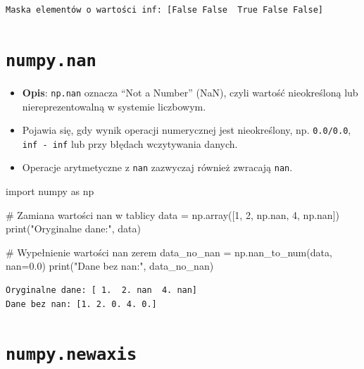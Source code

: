 \documentclass[
  polish,
  letterpaper,
  DIV=11,
  numbers=noendperiod]{scrreprt}
\newenvironment{Shaded}{\begin{snugshade}}{\end{snugshade}}
\newcommand{\BuiltInTok}[1]{\textcolor[rgb]{0.00,0.23,0.31}{#1}}
\newcommand{\CommentTok}[1]{\textcolor[rgb]{0.37,0.37,0.37}{#1}}
\newcommand{\DecValTok}[1]{\textcolor[rgb]{0.68,0.00,0.00}{#1}}
\newcommand{\FloatTok}[1]{\textcolor[rgb]{0.68,0.00,0.00}{#1}}
\newcommand{\ImportTok}[1]{\textcolor[rgb]{0.00,0.46,0.62}{#1}}
\newcommand{\NormalTok}[1]{\textcolor[rgb]{0.00,0.23,0.31}{#1}}
\newcommand{\OperatorTok}[1]{\textcolor[rgb]{0.37,0.37,0.37}{#1}}
\newcommand{\StringTok}[1]{\textcolor[rgb]{0.13,0.47,0.30}{#1}}
\providecommand{\tightlist}{%
  \setlength{\itemsep}{0pt}\setlength{\parskip}{0pt}}
\begin{document}
\begin{verbatim}
Maska elementów o wartości inf: [False False  True False False]
\end{verbatim}

\section{\texorpdfstring{\texttt{numpy.nan}}{numpy.nan}}\label{numpy.nan}

\begin{itemize}
\tightlist
\item
  \textbf{Opis}: \texttt{np.nan} oznacza ``Not a Number'' (NaN), czyli
  wartość nieokreśloną lub niereprezentowalną w systemie liczbowym.\\
\item
  Pojawia się, gdy wynik operacji numerycznej jest nieokreślony, np.
  \texttt{0.0/0.0}, \texttt{inf\ -\ inf} lub przy błędach wczytywania
  danych.\\
\item
  Operacje arytmetyczne z \texttt{nan} zazwyczaj również zwracają
  \texttt{nan}.
\end{itemize}

\begin{Shaded}
\begin{Highlighting}[]
\ImportTok{import}\NormalTok{ numpy }\ImportTok{as}\NormalTok{ np}

\CommentTok{\# Zamiana wartości nan w tablicy}
\NormalTok{data }\OperatorTok{=}\NormalTok{ np.array([}\DecValTok{1}\NormalTok{, }\DecValTok{2}\NormalTok{, np.nan, }\DecValTok{4}\NormalTok{, np.nan])}
\BuiltInTok{print}\NormalTok{(}\StringTok{"Oryginalne dane:"}\NormalTok{, data)}

\CommentTok{\# Wypełnienie wartości nan zerem}
\NormalTok{data\_no\_nan }\OperatorTok{=}\NormalTok{ np.nan\_to\_num(data, nan}\OperatorTok{=}\FloatTok{0.0}\NormalTok{)}
\BuiltInTok{print}\NormalTok{(}\StringTok{"Dane bez nan:"}\NormalTok{, data\_no\_nan)}
\end{Highlighting}
\end{Shaded}

\begin{verbatim}
Oryginalne dane: [ 1.  2. nan  4. nan]
Dane bez nan: [1. 2. 0. 4. 0.]
\end{verbatim}

\section{\texorpdfstring{\texttt{numpy.newaxis}}{numpy.newaxis}}\label{numpy.newaxis}
\end{document}
